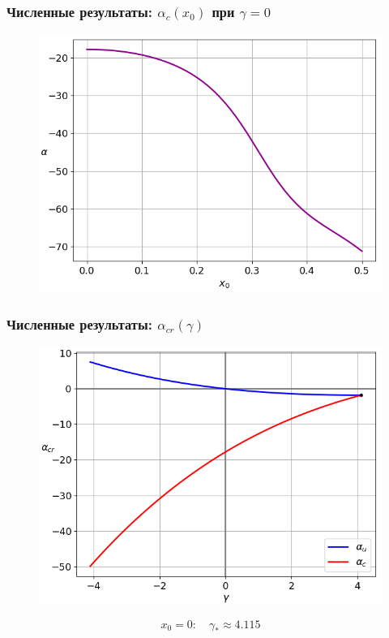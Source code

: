 \documentclass[fullscreen=true, unicode, bookmarks=false]{beamer}
\begin{document}
\begin{frame}
\frametitle{ Численные результаты: $ \alpha_c(x_0) $ при $ \gamma = 0 $ }

\begin{figure} 
\includegraphics[scale=0.65]{origins.png}  
\end{figure}

\end{frame}

\begin{frame}
\frametitle{ Численные результаты: $ \alpha_{cr}(\gamma) $ }

\begin{figure} 
\includegraphics[scale=0.55]{alphas_0.png}  
\end{figure}

$$ x_0 = 0: \quad \gamma_* \approx 4.115 $$

\end{frame}
\end{document}
